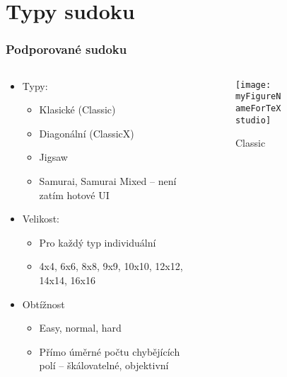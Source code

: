 \documentclass[aspectratio=43]{beamer}
\begin{document}
\section{Typy sudoku}
\begin{frame}[fragile]
	\frametitle{Podporované sudoku}
	\begin{columns}
		\begin{column}{0.5\columnwidth}
			\begin{itemize}
				\item Typy:
				      \begin{itemize}
					      \item Klasické (Classic)
					      \item Diagonální (ClassicX)
					      \item Jigsaw
					      \item Samurai, Samurai Mixed -- není zatím hotové UI
				      \end{itemize}
				\item Velikost:
				      \begin{itemize}
					      \item Pro každý typ individuální
					      \item 4x4, 6x6, 8x8, 9x9, 10x10, 12x12, 14x14, 16x16
				      \end{itemize}
				\item Obtížnost
				      \begin{itemize}
					      \item Easy, normal, hard
					      \item Přímo úměrné počtu chybějících polí -- škálovatelné, 
					      objektivní
				      \end{itemize}
			\end{itemize}
		\end{column}
		\begin{column}{0.5\columnwidth}
			\begin{columns}
				\begin{column}{0.5\columnwidth}
					\begin{figure}[H]
						\centering {}
						\texttt{[image: \\myFigureNameForTeXstudio]}
						\caption{Classic}
						\label{fig:Classic}
					\end{figure}
				\end{column}
				\begin{column}{0.5\columnwidth}
					\begin{figure}[H]
						\centering
						\def\myFigureNameForTeXstudio{../img/8x8DiagSudoku.jpg}

\end{figure}
\end{column}
\end{columns}
\end{column}
\end{columns}
\end{frame}
\end{document}
